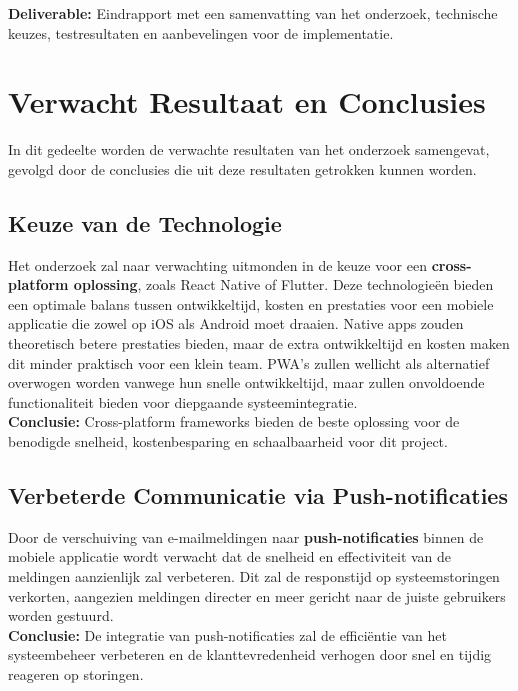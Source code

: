 \begin{enumerate}[label=\textbf{Fase \arabic*:}, left=0pt, labelsep=1em, itemsep=1em, topsep=1em]
	\textbf{Deliverable:} Eindrapport met een samenvatting van het onderzoek, technische keuzes, testresultaten en aanbevelingen voor de implementatie.
	
\end{enumerate}


\section{Verwacht Resultaat en Conclusies}
\label{sec:verwachte_resultaten}

In dit gedeelte worden de verwachte resultaten van het onderzoek samengevat, gevolgd door de conclusies die uit deze resultaten getrokken kunnen worden.

\subsection{Keuze van de Technologie}
Het onderzoek zal naar verwachting uitmonden in de keuze voor een \textbf{cross-platform oplossing}, zoals React Native of Flutter. Deze technologieën bieden een optimale balans tussen ontwikkeltijd, kosten en prestaties voor een mobiele applicatie die zowel op iOS als Android moet draaien. Native apps zouden theoretisch betere prestaties bieden, maar de extra ontwikkeltijd en kosten maken dit minder praktisch voor een klein team. PWA's zullen wellicht als alternatief overwogen worden vanwege hun snelle ontwikkeltijd, maar zullen onvoldoende functionaliteit bieden voor diepgaande systeemintegratie.
\\
\textbf{Conclusie:} Cross-platform frameworks bieden de beste oplossing voor de benodigde snelheid, kostenbesparing en schaalbaarheid voor dit project.

\subsection{Verbeterde Communicatie via Push-notificaties}
Door de verschuiving van e-mailmeldingen naar \textbf{push-notificaties} binnen de mobiele applicatie wordt verwacht dat de snelheid en effectiviteit van de meldingen aanzienlijk zal verbeteren. Dit zal de responstijd op systeemstoringen verkorten, aangezien meldingen directer en meer gericht naar de juiste gebruikers worden gestuurd.
\\
\textbf{Conclusie:} De integratie van push-notificaties zal de efficiëntie van het systeembeheer verbeteren en de klanttevredenheid verhogen door snel en tijdig reageren op storingen.

